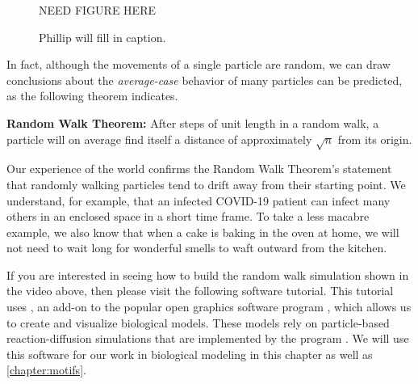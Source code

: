 \begin{figure}[h]
\centering
\mySfFamily
NEED FIGURE HERE
\caption{Phillip will fill in caption.}
\label{fig:random_walk_multiple_particles}
\end{figure}

In fact, although the movements of a single particle are random, we can draw conclusions about the \textit{average-case} behavior of many particles can be predicted, as the following theorem indicates.

\textbf{Random Walk Theorem:} After  steps of unit length in a random walk, a particle will on average find itself a distance of approximately $\sqrt{n}$ from its origin.\\

\begin{note}\end{note}

Our experience of the world confirms the Random Walk Theorem's statement that randomly walking particles tend to drift away from their starting point. We understand, for example, that an infected COVID-19 patient can infect many others in an enclosed space in a short time frame. To take a less macabre example, we also know that when a cake is baking in the oven at home, we will not need to wait long for wonderful smells to waft outward from the kitchen.

If you are interested in seeing how to build the random walk simulation shown in the video above, then please visit the following software tutorial. This tutorial uses , an add-on to the popular open graphics software program  , which allows us to create and visualize biological models. These models rely on particle-based reaction-diffusion simulations that are implemented by the program  . We will use this software for our work in biological modeling in this chapter as well as \autoref{chapter:motifs}.\\

\begin{note}\end{note}

